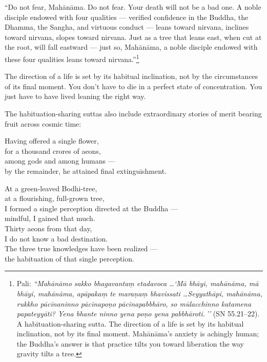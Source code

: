 ``Do not fear, Mahānāma. Do not fear. Your death will not be a bad one. A noble disciple endowed with four qualities --- verified confidence in the Buddha, the Dhamma, the Sangha, and virtuous conduct --- leans toward nirvana, inclines toward nirvana, slopes toward nirvana. Just as a tree that leans east, when cut at the root, will fall eastward --- just so, Mahānāma, a noble disciple endowed with these four qualities leans toward nirvana.''\footnote{Pali: \textit{``Mahānāmo sakko bhagavantaṃ etadavoca \ldots `Mā bhāyi, mahānāma, mā bhāyi, mahānāma, apāpakaṃ te maraṇaṃ bhavissati \ldots Seyyathāpi, mahānāma, rukkho pācīnaninno pācīnapoṇo pācīnapabbhāro, so mūlacchinno katamena papateyyāti? Yena bhante ninno yena poṇo yena pabbhāroti.\,''} (SN 55.21--22). A habituation-sharing sutta. The direction of a life is set by its habitual inclination, not by its final moment. Mahānāma's anxiety is achingly human; the Buddha's answer is that practice tilts you toward liberation the way gravity tilts a tree.}

The direction of a life is set by its habitual inclination, not by the circumstances of its final moment. You don't have to die in a perfect state of concentration. You just have to have lived leaning the right way.

The habituation-sharing suttas also include extraordinary stories of merit bearing fruit across cosmic time:

\begin{versebox}
Having offered a single flower,\\
for a thousand crores of aeons,\\
among gods and among humans ---\\
by the remainder, he attained final extinguishment.
\end{versebox}

\begin{versebox}
At a green-leaved Bodhi-tree,\\
at a flourishing, full-grown tree,\\
I formed a single perception directed at the Buddha ---\\
mindful, I gained that much.\\[6pt]
Thirty aeons from that day,\\
I do not know a bad destination.\\
The three true knowledges have been realized ---\\
the habituation of that single perception.
\end{versebox}

